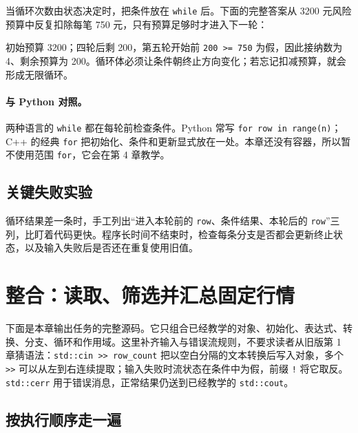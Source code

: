 当循环次数由状态决定时，把条件放在 \texttt{while} 后。下面的完整答案从 3200 元风险预算中反复扣除每笔 750 元，只有预算足够时才进入下一轮：



初始预算 3200；四轮后剩 200，第五轮开始前 \texttt{200 >= 750} 为假，因此接纳数为 4、剩余预算为 200。循环体必须让条件朝终止方向变化；若忘记扣减预算，就会形成无限循环。

\paragraph{与 Python 对照。}
两种语言的 \texttt{while} 都在每轮前检查条件。Python 常写 \texttt{for row in range(n)}；C++ 的经典 \texttt{for} 把初始化、条件和更新显式放在一处。本章还没有容器，所以暂不使用范围 \texttt{for}，它会在第 4 章教学。

\subsection{关键失败实验}

循环结果差一条时，手工列出“进入本轮前的 \texttt{row}、条件结果、本轮后的 \texttt{row}”三列，比盯着代码更快。程序长时间不结束时，检查每条分支是否都会更新终止状态，以及输入失败后是否还在重复使用旧值。

\section{整合：读取、筛选并汇总固定行情}

下面是本章输出任务的完整源码。它只组合已经教学的对象、初始化、表达式、转换、分支、循环和作用域。这里补齐输入与错误流规则，不要求读者从旧版第 1 章猜语法：\texttt{std::cin >> row\_count} 把以空白分隔的文本转换后写入对象，多个 \texttt{>>} 可以从左到右连续提取；输入失败时流状态在条件中为假，前缀 \texttt{!} 将它取反。\texttt{std::cerr} 用于错误消息，正常结果仍送到已经教学的 \texttt{std::cout}。



\subsection{按执行顺序走一遍}

